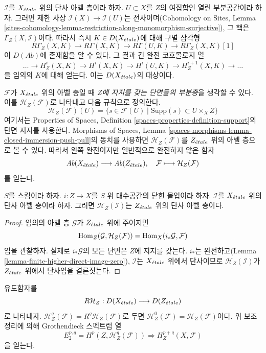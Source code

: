 \medskip\noindent
$\mathcal{I}$를 $X_{\acute{e}tale}$ 위의 단사 아벨 층이라 하자.
$U \subset X$를 $Z$의 여집합인 열린 부분공간이라 하자. 그러면 제한 사상
$\mathcal{I}(X) \to \mathcal{I}(U)$는 전사이며(Cohomology on Sites,
Lemma
\ref{sites-cohomology-lemma-restriction-along-monomorphism-surjective}),
그 핵은 $\Gamma_Z(X, \mathcal{I})$이다. 따라서 즉시
$K \in D(X_{\acute{e}tale})$에 대해 구별 삼각형
$$
R\Gamma_Z(X, K) \to R\Gamma(X, K) \to R\Gamma(U, K) \to R\Gamma_Z(X, K)[1]
$$
이 $D(\textit{Ab})$에 존재함을 알 수 있다. 그 결과 긴 완전 코호몰로지 열
$$
\ldots \to H^i_Z(X, K) \to H^i(X, K) \to H^i(U, K) \to
H^{i + 1}_Z(X, K) \to \ldots
$$
을 임의의 $K$에 대해 얻는다. 이는 $D(X_{\acute{e}tale})$의 대상이다.

\medskip\noindent
$\mathcal{F}$가 $X_{\acute{e}tale}$ 위의 아벨 층일 때
{\it $Z$에 지지를 갖는 단면들의 부분층}을 생각할 수 있다.
이를 $\mathcal{H}_Z(\mathcal{F})$로 나타내고 다음 규칙으로 정의한다.
$$
\mathcal{H}_Z(\mathcal{F})(U) =
\{s \in \mathcal{F}(U) \mid \text{Supp}(s) \subset U \times_X Z\}
$$
여기서는 Properties of Spaces, Definition
\ref{spaces-properties-definition-support}의 단면 지지를 사용한다.
Morphisms of Spaces, Lemma
\ref{spaces-morphisms-lemma-closed-immersion-push-pull}의 동치를 사용하면
$\mathcal{H}_Z(\mathcal{F})$를 $Z_{\acute{e}tale}$ 위의 아벨 층으로 볼 수 있다.
따라서 왼쪽 완전이지만 일반적으로 완전하지 않은 함자
$$
\textit{Ab}(X_{\acute{e}tale}) \longrightarrow \textit{Ab}(Z_{\acute{e}tale}),\quad
\mathcal{F} \longmapsto \mathcal{H}_Z(\mathcal{F})
$$
를 얻는다.

\begin{lemma}
\label{lemma-sections-with-support-acyclic}
$S$를 스킴이라 하자. $i : Z \to X$를 $S$ 위 대수공간의 닫힌
몰입이라 하자. $\mathcal{I}$를 $X_{\acute{e}tale}$ 위의 단사 아벨 층이라
하자. 그러면 $\mathcal{H}_Z(\mathcal{I})$는 $Z_{\acute{e}tale}$ 위의 단사
아벨 층이다.
\end{lemma}

\begin{proof}
임의의 아벨 층 $\mathcal{G}$가 $Z_{\acute{e}tale}$ 위에 주어지면
$$
\mathop{\mathrm{Hom}}\nolimits_Z(\mathcal{G}, \mathcal{H}_Z(\mathcal{F})) =
\mathop{\mathrm{Hom}}\nolimits_X(i_*\mathcal{G}, \mathcal{F})
$$
임을 관찰하자. 실제로 $i_*\mathcal{G}$의 모든 단면은 $Z$에 지지를
갖는다. $i_*$는 완전하고(Lemma
\ref{lemma-finite-higher-direct-image-zero}), $\mathcal{I}$는
$X_{\acute{e}tale}$ 위에서 단사이므로 $\mathcal{H}_Z(\mathcal{I})$가
$Z_{\acute{e}tale}$ 위에서 단사임을 결론짓는다.
\end{proof}

\noindent
유도함자를
$$
R\mathcal{H}_Z : D(X_{\acute{e}tale}) \longrightarrow D(Z_{\acute{e}tale})
$$
로 나타내자. $\mathcal{H}^q_Z(\mathcal{F}) =
R^q\mathcal{H}_Z(\mathcal{F})$로 두면
$\mathcal{H}^0_Z(\mathcal{F}) = \mathcal{H}_Z(\mathcal{F})$이다.
위 보조정리에 의해 Grothendieck 스펙트럼 열
$$
E_2^{p, q} = H^p(Z, \mathcal{H}^q_Z(\mathcal{F}))
\Rightarrow H^{p + q}_Z(X, \mathcal{F})
$$
을 얻는다.

